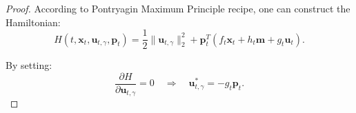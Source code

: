 \begin{proof}


According to Pontryagin Maximum Principle \cite{1100008, Kirk1970OptimalCT} recipe, one can construct the Hamiltonian: 
\begin{equation}
H(t,\mathbf{x}_t,\mathbf{u}_{t,\gamma},\mathbf{p}_t)=\frac{1}{2}\|\mathbf{u}_{t, \gamma}\|_{2}^{2}+ \mathbf{p}_t^{T} \left( f_t \mathbf{x}_t + h_t \mathbf{m} + g_t \mathbf{u}_t \right).
\end{equation}

By setting: 
\begin{equation}
\frac{\partial H}{\partial \mathbf{u}_{t, \gamma}} = 0 \quad \Rightarrow \quad \mathbf{u}_{t, \gamma}^{*} = - g_t \mathbf{p}_t.
\end{equation}



\end{proof}
